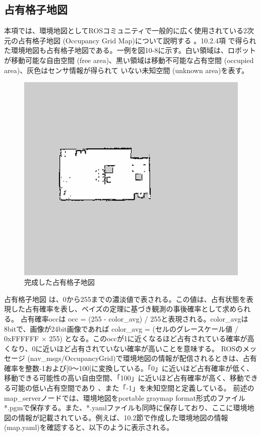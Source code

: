 \subsection{占有格子地図}

本項では、環境地図としてROSコミュニティで一般的に広く使用されている2次元の占有格子地図 (Occupancy Grid Map)について説明する  。10.2.4項  で得られた環境地図も占有格子地図である。一例を図10-8に示す。白い領域は、ロボットが移動可能な自由空間 (free area)、黒い領域は移動不可能な占有空間 (occupied area)、灰色はセンサ情報が得られて  いない未知空間 (unknown area)を表す。

\begin{figure}[ht]
  \centering
  \includegraphics[width=\columnwidth]{pictures/chapter10/pic_10_08.png}
  \caption{完成した占有格子地図}
\end{figure}

占有格子地図  は、0から255までの濃淡値で表される。この値は、占有状態を表現した占有確率を表し、ベイズの定理に基づき観測の事後確率として求められる。  占有確率occは occ = (255 - color\_avg) / 255と表現される。color\_avgは8bitで、画像が24bit画像であれば color\_avg = (セルのグレースケール値 / 0xFFFFFF × 255) となる。このoccが1に近くなるほど占有されている確率が高くなり、0に近いほど占有されていない確率が高いことを意味する。
ROSのメッセージ (nav\_msgs/OccupancyGrid)で環境地図の情報が配信されるときは、占有確率を整数-1および[0〜100]に変換している。「0」に近いほど占有確率が低く、移動できる可能性の高い自由空間、「100」に近いほど占有確率が高く、移動できる可能の低い占有空間であり  、また「-1」を未知空間と定義している。
前述のmap\_serverノードでは、環境地図をportable graymap format形式のファイル*.pgmで保存する。また、*.yamlファイルも同時に保存しており、ここに環境地図の情報が記載されている。例えば、10.2節で作成した環境地図の情報(map.yaml)を確認すると、以下のように表示される。


